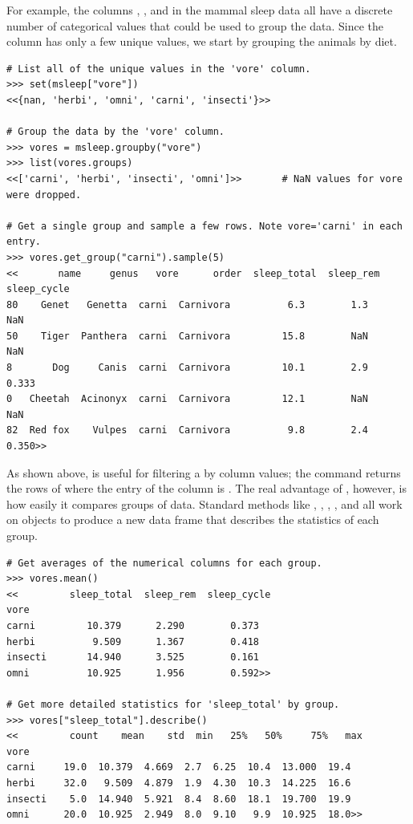 For example, the columns , , and  in the mammal sleep data all have a discrete number of categorical values that could be used to group the data.
Since the  column has only a few unique values, we start by grouping the animals by diet.

\begin{lstlisting}
# List all of the unique values in the 'vore' column.
>>> set(msleep["vore"])
<<{nan, 'herbi', 'omni', 'carni', 'insecti'}>>

# Group the data by the 'vore' column.
>>> vores = msleep.groupby("vore")
>>> list(vores.groups)
<<['carni', 'herbi', 'insecti', 'omni']>>       # NaN values for vore were dropped.

# Get a single group and sample a few rows. Note vore='carni' in each entry.
>>> vores.get_group("carni").sample(5)
<<       name     genus   vore      order  sleep_total  sleep_rem  sleep_cycle
80    Genet   Genetta  carni  Carnivora          6.3        1.3          NaN
50    Tiger  Panthera  carni  Carnivora         15.8        NaN          NaN
8       Dog     Canis  carni  Carnivora         10.1        2.9        0.333
0   Cheetah  Acinonyx  carni  Carnivora         12.1        NaN          NaN
82  Red fox    Vulpes  carni  Carnivora          9.8        2.4        0.350>>
\end{lstlisting}

As shown above,  is useful for filtering a  by column values;
the command  returns the rows of  where the entry of the  column is .
The real advantage of , however, is how easily it compares groups of data.
Standard  methods like , , , , and  all work on  objects to produce a new data frame that describes the statistics of each group.

\begin{lstlisting}
# Get averages of the numerical columns for each group.
>>> vores.mean()
<<         sleep_total  sleep_rem  sleep_cycle
vore
carni         10.379      2.290        0.373
herbi          9.509      1.367        0.418
insecti       14.940      3.525        0.161
omni          10.925      1.956        0.592>>

# Get more detailed statistics for 'sleep_total' by group.
>>> vores["sleep_total"].describe()
<<         count    mean    std  min   25%   50%     75%   max
vore
carni     19.0  10.379  4.669  2.7  6.25  10.4  13.000  19.4
herbi     32.0   9.509  4.879  1.9  4.30  10.3  14.225  16.6
insecti    5.0  14.940  5.921  8.4  8.60  18.1  19.700  19.9
omni      20.0  10.925  2.949  8.0  9.10   9.9  10.925  18.0>>
\end{lstlisting}

